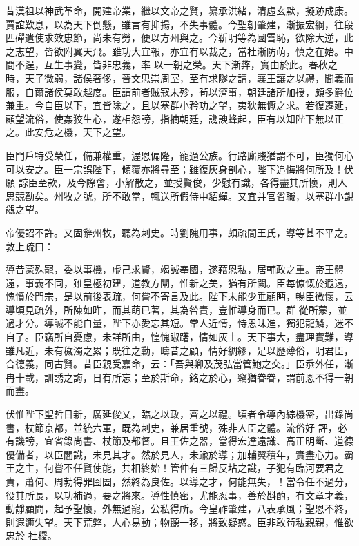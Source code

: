 \begin{pinyinscope}
 昔漢祖以神武革命，開建帝業，繼以文帝之賢，纂承洪緒，清虛玄默，擬跡成康。賈誼歎息，以為天下倒懸，雖言有抑揚，不失事體。今聖朝肇建，漸振宏綱，往段匹磾遣使求效忠節，尚未有勞，便以方州與之。今靳明等為國雪恥，欲除大逆，此之志望，皆欲附翼天飛。雖功大宜報，亦宜有以裁之，當杜漸防萌，慎之在始。中間不逞，互生事變，皆非忠義，率
 以一朝之榮。天下漸弊，實由於此。春秋之時，天子微弱，諸侯奢侈，晉文思崇周室，至有求隧之請，襄王讓之以禮，聞義而服，自爾諸侯莫敢越度。臣謂前者賊寇未殄，茍以濟事，朝廷諸所加授，頗多爵位兼重。今自臣以下，宜皆除之，且以塞群小矜功之望，夷狄無懨之求。若復遷延，顧望流俗，使姦狡生心，遂相怨謗，指摘朝廷，讒諛蜂起，臣有以知陛下無以正之。此安危之機，天下之望。



 臣門戶特受榮任，備兼權重，渥恩偏隆，寵過公族。行路廝賤猶謂不可，臣獨何心可以安之。臣一宗誤陛下，傾覆亦將尋至；雖復灰身剖心，陛下追悔將何所及！伏願
 諒臣至款，及今際會，小解散之，並授賢俊，少慰有識，各得盡其所懷，則人思競勸矣。州牧之號，所不敢當，輒送所假侍中貂蟬。又宜并官省職，以塞群小覬覦之望。



 帝優詔不許。又固辭州牧，聽為刺史。時劉隗用事，頗疏間王氏，導等甚不平之。敦上疏曰：



 導昔蒙殊寵，委以事機，虛己求賢，竭誠奉國，遂藉恩私，居輔政之重。帝王體遠，事義不同，雖皇極初建，道教方闡，惟新之美，猶有所闕。臣每慷慨於遐遠，愧憤於門宗，是以前後表疏，何嘗不寄言及此。陛下未能少垂顧眄，暢臣微懷，云導頃見疏外，所陳如昨，而其萌已著，其為咎責，豈惟導身而已。群
 從所蒙，並過才分。導誠不能自量，陛下亦愛忘其短。常人近情，恃恩昧進，獨犯龍鱗，迷不自了。臣竊所自憂慮，未詳所由，惶愧踧躇，情如灰土。天下事大，盡理實難，導雖凡近，未有穢濁之累；既往之勳，疇昔之顧，情好綢繆，足以歷薄俗，明君臣，合德義，同古賢。昔臣親受嘉命，云：「吾與卿及茂弘當管鮑之交。」臣忝外任，漸冉十載，訓誘之誨，日有所忘；至於斯命，銘之於心，竊猶眷眷，謂前恩不得一朝而盡。



 伏惟陛下聖哲日新，廣延俊乂，臨之以政，齊之以禮。頃者令導內綜機密，出錄尚書，杖節京都，並統六軍，既為刺史，兼居重號，殊非人臣之體。流俗好
 評，必有譏謗，宜省錄尚書、杖節及都督。且王佐之器，當得宏達遠識、高正明斷、道德優備者，以臣闇識，未見其才。然於見人，未踰於導；加輔翼積年，實盡心力。霸王之主，何嘗不任賢使能，共相終始！管仲有三歸反坫之識，子犯有臨河要君之責，蕭何、周勃得罪囹圄，然終為良佐。以導之才，何能無失，！當令任不過分，役其所長，以功補過，要之將來。導性慎密，尤能忍事，善於斟酌，有文章才義，動靜顧問，起予聖懷，外無過寵，公私得所。今皇祚肇建，八表承風；聖恩不終，則遐邇失望。天下荒弊，人心易動；物聽一移，將致疑惑。臣非敢茍私親親，惟欲忠於
 社稷。




\end{pinyinscope}
